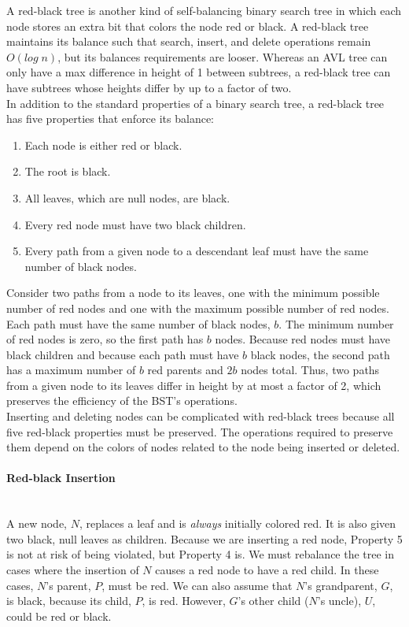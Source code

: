 A red-black tree is another kind of self-balancing binary search tree in which each node stores an extra bit that colors the node red or black. A red-black tree maintains its balance such that search, insert, and delete operations remain $O(log\;n)$, but its balances requirements are looser. Whereas an AVL tree can only have a max difference in height of 1 between subtrees, a red-black tree can have subtrees whose heights differ by up to a factor of two. \\

In addition to the standard properties of a binary search tree, a red-black tree has five properties that enforce its balance:

\begin{enumerate}
   \item Each node is either red or black.
   \item The root is black.
   \item All leaves, which are null nodes, are black.
   \item Every red node must have two black children.
   \item Every path from a given node to a descendant leaf must have the same number of black nodes.
\end{enumerate}

Consider two paths from a node to its leaves, one with the minimum possible number of red nodes and one with the maximum possible number of red nodes. Each path must have the same number of black nodes, $b$. The minimum number of red nodes is zero, so the first path has $b$ nodes. Because red nodes must have black children and because each path must have $b$ black nodes, the second path has a maximum number of $b$ red parents and $2b$ nodes total. Thus, two paths from a given node to its leaves differ in height by at most a factor of 2, which preserves the efficiency of the BST's operations. \\

Inserting and deleting nodes can be complicated with red-black trees because all five red-black properties must be preserved. The operations required to preserve them depend on the colors of nodes related to the node being inserted or deleted.

\paragraph{Red-black Insertion} \hspace*{1mm} \vspace*{2mm} \\
A new node, $N$, replaces a leaf and is \textit{always} initially colored red. It is also given two black, null leaves as children. Because we are inserting a red node, Property 5 is not at risk of being violated, but Property 4 is. We must rebalance the tree in cases where the insertion of $N$ causes a red node to have a red child. In these cases, $N$'s parent, $P$, must be red. We can also assume that $N$'s grandparent, $G$, is black, because its child, $P$, is red. However, $G$'s other child ($N$'s uncle), $U$, could be red or black. \\

